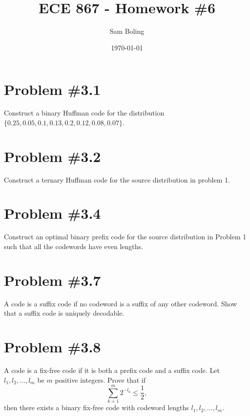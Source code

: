 \documentclass{article}
\title{ECE 867 - Homework \#6}
\author{Sam Boling}
\date{\today}
\begin{document}
\maketitle

\section*{Problem \#3.1}
Construct a binary Huffman code for the distribution
$\{0.25, 0.05, 0.1, 0.13, 0.2, 0.12, 0.08, 0.07\}$.

\section*{Problem \#3.2}
Construct a ternary Huffman code for the source distribution in problem 1.

\section*{Problem \#3.4}
Construct an optimal binary prefix code for the source distribution in
Problem 1 such that all the codewords have even lengths.

\section*{Problem \#3.7}
A code is a suffix code if no codeword is a suffix of any other codeword.
Show that a suffix code is uniquely decodable.

\section*{Problem \#3.8}
A code is a fix-free code if it is both a prefix code and a suffix code.
Let $l_1, l_2, \dots, l_m$ be $m$ positive integers. Prove that if
$$
\sum_{k=1}^m 2^{-l_k} \leq \frac{1}{2},
$$
then there exists a binary fix-free code with codeword lengths 
$l_1, l_2, \dots, l_m$.
\end{document}
